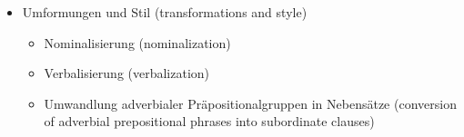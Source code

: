 \documentclass[a4paper]{article}
\begin{document}
\begin{itemize}
\begin{itemize}
                \item subjektive Bedeutungen der Modalverben {\small (subjective meanings of modal verbs)}
                \begin{itemize}
                    \item Vermutung {\small (assumption)}
                    \item Unsicherheit {\small (uncertainty)}
                    \item Gerücht {\small (rumor)}
                    \item Empfehlung {\small (recommendation)}
                \end{itemize}
            \end{itemize}
            
            \item Umformungen und Stil {\small (transformations and style)}
            \begin{itemize}
                \item Nominalisierung {\small (nominalization)}
                \item Verbalisierung {\small (verbalization)}
                \item Umwandlung adverbialer Präpositionalgruppen in Nebensätze {\small (conversion of adverbial prepositional phrases into subordinate clauses)}
            \end{itemize}
        \end{itemize}
\end{document}
